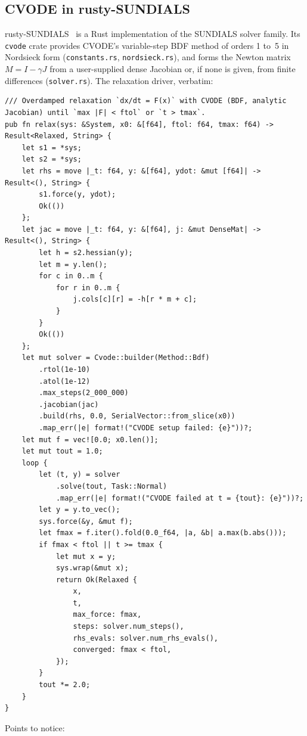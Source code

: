 \subsection{CVODE in rusty-SUNDIALS}
rusty-SUNDIALS~\cite{rusty} is a Rust implementation of the SUNDIALS solver family. Its \texttt{cvode} crate provides
CVODE's variable-step BDF method of orders 1 to~5 in Nordsieck form (\texttt{constants.rs}, \texttt{nordsieck.rs}),
and forms the Newton matrix $M=I-\gamma J$ from a user-supplied dense Jacobian or, if none is given, from finite
differences (\texttt{solver.rs}). The relaxation driver, verbatim:
\begin{lstlisting}[language={},title={lib.rs, lines 252--300}]
/// Overdamped relaxation `dx/dt = F(x)` with CVODE (BDF, analytic Jacobian) until `max |F| < ftol` or `t > tmax`.
pub fn relax(sys: &System, x0: &[f64], ftol: f64, tmax: f64) -> Result<Relaxed, String> {
    let s1 = *sys;
    let s2 = *sys;
    let rhs = move |_t: f64, y: &[f64], ydot: &mut [f64]| -> Result<(), String> {
        s1.force(y, ydot);
        Ok(())
    };
    let jac = move |_t: f64, y: &[f64], j: &mut DenseMat| -> Result<(), String> {
        let h = s2.hessian(y);
        let m = y.len();
        for c in 0..m {
            for r in 0..m {
                j.cols[c][r] = -h[r * m + c];
            }
        }
        Ok(())
    };
    let mut solver = Cvode::builder(Method::Bdf)
        .rtol(1e-10)
        .atol(1e-12)
        .max_steps(2_000_000)
        .jacobian(jac)
        .build(rhs, 0.0, SerialVector::from_slice(x0))
        .map_err(|e| format!("CVODE setup failed: {e}"))?;
    let mut f = vec![0.0; x0.len()];
    let mut tout = 1.0;
    loop {
        let (t, y) = solver
            .solve(tout, Task::Normal)
            .map_err(|e| format!("CVODE failed at t = {tout}: {e}"))?;
        let y = y.to_vec();
        sys.force(&y, &mut f);
        let fmax = f.iter().fold(0.0_f64, |a, &b| a.max(b.abs()));
        if fmax < ftol || t >= tmax {
            let mut x = y;
            sys.wrap(&mut x);
            return Ok(Relaxed {
                x,
                t,
                max_force: fmax,
                steps: solver.num_steps(),
                rhs_evals: solver.num_rhs_evals(),
                converged: fmax < ftol,
            });
        }
        tout *= 2.0;
    }
}
\end{lstlisting}
Points to notice:
